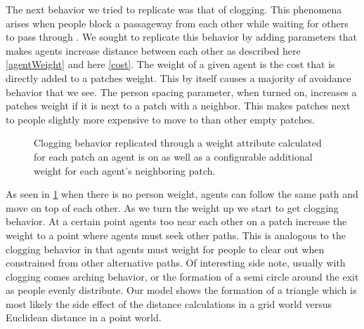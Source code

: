 \documentclass[12pt,letterpaper]{article}
\begin{document}
The next behavior we tried to replicate was that of clogging.  This phenomena arises when people block a passageway from each other while waiting for others to pass through \cite{almeidaCrowdSimulationModeling2013}.  We sought to replicate this behavior by adding parameters that makes agents increase distance between each other as described here \ref{agentWeight} and here \ref{cost}.  The weight of a given agent is the cost that is directly added to a patches weight.  This by itself causes a majority of avoidance behavior that we see. The person spacing parameter, when turned on, increases a patches weight if it is next to a patch with a neighbor.  This makes patches next to people slightly more expensive to move to than other empty patches.  


\begin{figure}[!ht]
  \centering
  \hfill
  \caption{Clogging behavior replicated through a weight attribute calculated for each patch an agent is on as well as a configurable additional weight for each agent's neighboring patch. }
  \label{clogging}
\end{figure}

As seen in \ref{clogging} when there is no person weight, agents can follow the same path and move on top of each other.  As we turn the weight up we start to get clogging behavior.  At a certain point agents too near each other on a patch increase the weight to a point where agents must seek other paths.  This is analogous to the clogging behavior in that agents must weight for people to clear out when constrained from other alternative paths.  Of interesting side note, usually with clogging comes arching behavior, or the formation of a semi circle around the exit as people evenly distribute.  Our model shows the formation of a triangle which is most likely the side effect of the distance calculations in a grid world versus Euclidean distance in a point world. 
\end{document}
